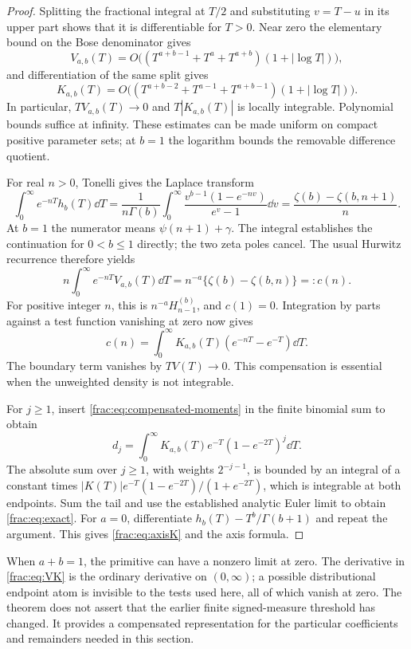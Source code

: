 \begin{proof}
Splitting the fractional integral at $T/2$ and substituting $v=T-u$
in its upper part shows that it is differentiable for $T>0$.
Near zero the elementary bound on the Bose denominator gives
\[
 V_{a,b}(T)=O\bigl((T^{a+b-1}+T^a+T^{a+b})
                     (1+|\log T|)\bigr),
\]
and differentiation of the same split gives
\[
 K_{a,b}(T)=O\bigl((T^{a+b-2}+T^{a-1}+T^{a+b-1})
                     (1+|\log T|)\bigr).
\]
In particular, $TV_{a,b}(T)\to0$ and $T|K_{a,b}(T)|$ is locally
integrable. Polynomial bounds suffice at infinity. These estimates
can be made uniform on compact positive parameter sets; at $b=1$
the logarithm bounds the removable difference quotient.

For real $n>0$, Tonelli gives the Laplace transform
\[
 \int_0^\infty e^{-nT}h_b(T)\dd T
 =\frac{1}{n\Gamma(b)}\int_0^\infty
       \frac{v^{b-1}(1-e^{-nv})}{e^v-1}\dd v
 =\frac{\zeta(b)-\zeta(b,n+1)}n.
\]
At $b=1$ the numerator means $\psi(n+1)+\gamma$.
The integral establishes the continuation for $0<b\le1$ directly;
the two zeta poles cancel. The usual Hurwitz recurrence
\cite{DLMFHurwitz} therefore yields
\[
 n\int_0^\infty e^{-nT}V_{a,b}(T)\dd T
 =n^{-a}\{\zeta(b)-\zeta(b,n)\}=:c(n).
\]
For positive integer $n$, this is $n^{-a}H_{n-1}^{(b)}$, and $c(1)=0$.
Integration by parts against a test function vanishing at zero now gives
\begin{equation}\label{frac:eq:compensated-moments}
 c(n)=\int_0^\infty K_{a,b}(T)
                  (e^{-nT}-e^{-T})\dd T.
\end{equation}
The boundary term vanishes by $TV(T)\to0$. This compensation is
essential when the unweighted density is not integrable.

For $j\ge1$, insert \eqref{frac:eq:compensated-moments} in the finite
binomial sum to obtain
\[
 d_j=\int_0^\infty K_{a,b}(T)e^{-T}(1-e^{-2T})^j\dd T.
\]
The absolute sum over $j\ge1$, with weights $2^{-j-1}$, is bounded
by an integral of a constant times
$|K(T)|e^{-T}(1-e^{-2T})/(1+e^{-2T})$, which is integrable at both
endpoints. Sum the tail and use the established analytic Euler limit
to obtain \eqref{frac:eq:exact}. For $a=0$, differentiate
$h_b(T)-T^b/\Gamma(b+1)$ and repeat the argument. This gives
\eqref{frac:eq:axisK} and the axis formula.
\end{proof}

\begin{remark}
When $a+b=1$, the primitive can have a nonzero limit at zero.
The derivative in \eqref{frac:eq:VK} is the ordinary derivative on
$(0,\infty)$; a possible distributional endpoint atom is invisible
to the tests used here, all of which vanish at zero. The theorem
does not assert that the earlier finite signed-measure threshold
has changed. It provides a compensated representation for the
particular coefficients and remainders needed in this section.
\end{remark}

